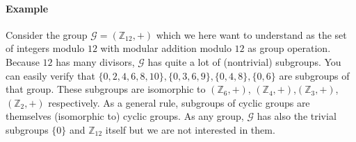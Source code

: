 \paragraph{Example}
Consider the group $\mathcal{G} = (\mathbb{Z}_{12}, +)$ which we here want to understand as the set of integers modulo $12$ with modular addition modulo $12$ as group operation. Because $12$ has many divisors, $\mathcal{G}$ has quite a lot of (nontrivial) subgroups. You can easily verify that $\{0,2,4,6,8,10\}, \{0,3,6,9\}, \{0,4,8\}, \{0,6\}$ are subgroups of that group. These subgroups are isomorphic to $(\mathbb{Z}_{6}, +)$, $(\mathbb{Z}_{4}, +)$,$(\mathbb{Z}_{3}, +)$, $(\mathbb{Z}_{2}, +)$ respectively. As a general rule, subgroups of cyclic groups are themselves (isomorphic to) cyclic groups. As any group, $\mathcal{G}$ has also the trivial subgroups $\{ 0 \}$ and $\mathbb{Z}_{12}$ itself but we are not interested in them. 













